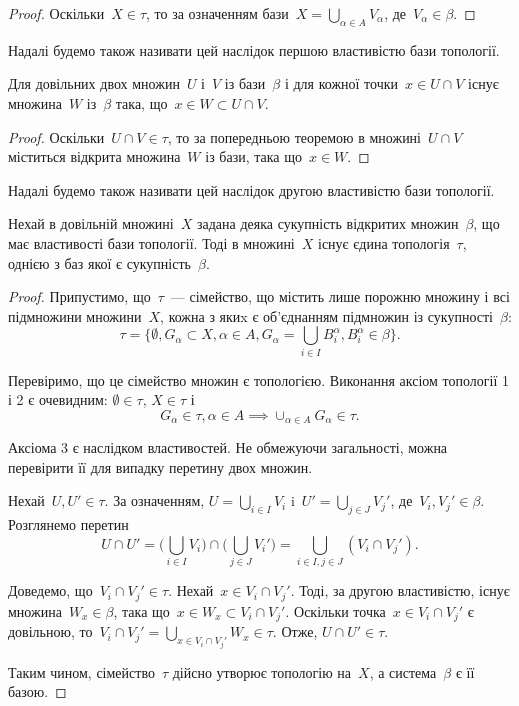 \begin{proof}
    Оскільки~$X \in \tau$, то за означенням бази~$X = \bigcup_{\alpha \in A} V_\alpha$, де~$V_\alpha \in \beta$.
\end{proof}

Надалі будемо також називати цей наслідок першою властивістю бази топології.

\begin{corollary}
    Для довільних двох множин~$U$ і~$V$ із бази~$\beta$ і для кожної точки~$x \in U \cap V$ існує множина~$W$ із~$\beta$ така, що~$x \in W \subset U \cap V$.
\end{corollary}

\begin{proof}
    Оскільки~$U \cap V \in \tau$, то за попередньою теоремою в множині~$U \cap V$ міститься відкрита множина~$W$ із бази, така що~$x \in W$.
\end{proof}

Надалі будемо також називати цей наслідок другою властивістю бази топології.

\begin{theorem}
    Нехай в довільній множині~$X$ задана деяка сукупність відкритих множин~$\beta$, що має властивості бази топології. Тоді в множині~$X$ існує єдина топологія~$\tau$, однією з баз якої є сукупність~$\beta$.
\end{theorem}

\begin{proof}
    Припустимо, що~$\tau$~--- сімейство, що містить лише порожню множину і всі підмножини множини~$X$, кожна з якиx є об'єднанням підмножин із сукупності~$\beta$: \[ \tau = \Bigg\{ \emptyset, G_\alpha \subset X, \alpha \in A, G_\alpha = \bigcup_{i \in I} B_i^\alpha, B_i^\alpha \in \beta \Bigg\} . \]

    Перевіримо, що це сімейство множин є топологією. Виконання аксіом топології 1 і 2 є очевидним: $\emptyset \in \tau$, $X \in \tau$ і
    \[ G_\alpha \in \tau, \alpha \in A \implies \cup_{\alpha \in A} G_\alpha \in \tau. \]

    Аксіома 3 є наслідком властивостей. Не обмежуючи загальності, можна перевірити її для випадку перетину двох множин.

    Нехай~$U, U' \in \tau$. За означенням, $U = \bigcup_{i \in I} V_i$ i~$U' = \bigcup_{j \in J} V_j'$, де~$V_i, V_j' \in \beta$. Розглянемо перетин \[ U \cap U' = \Bigg( \bigcup_{i \in I} V_i \Bigg) \cap \Bigg( \bigcup_{j \in J} V_i' \Bigg) = \bigcup_{i \in I, j \in J} (V_i \cap V_j'). \]

    Доведемо, що~$V_i \cap V_j' \in \tau$. Нехай~$x \in V_i \cap V_j'$. Тоді, за другою властивістю, існує множина~$W_x \in \beta$, така що~$x \in W_x \subset V_i \cap V_j'$. Оскільки точка~$x \in V_i \cap V_j'$ є довільною, то~$V_i \cap V_j' = \bigcup_{x \in V_i \cap V_j'} W_x \in \tau$. Отже, $U \cap U' \in \tau$.

    Таким чином, сімейство~$\tau$ дійсно утворює топологію на~$X$, а система~$\beta$ є її базою.
\end{proof}

